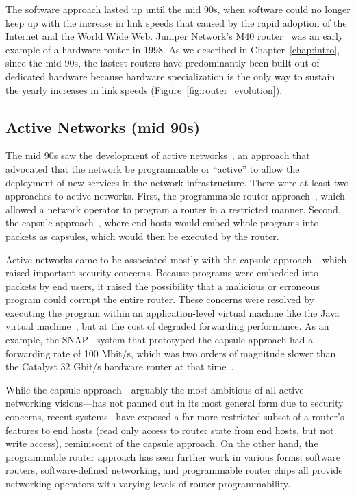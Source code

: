 The software approach lasted up until the mid 90s, when software could no
longer keep up with the increase in link speeds that caused by the rapid
adoption of the Internet and the World Wide Web. Juniper Network's M40
router~\cite{juniperm40} was an early example of a hardware router in 1998.  As
we described in Chapter~\ref{chap:intro}, since the mid 90s, the fastest
routers have predominantly been built out of dedicated hardware because
hardware specialization is the only way to sustain the yearly increases in link
speeds (Figure~\ref{fig:router_evolution}).

\subsection{Active Networks (mid 90s)}
The mid 90s saw the development of active networks~\cite{ants, switchware}, an
approach that advocated that the network be programmable or ``active'' to allow
the deployment of new services in the network infrastructure. There were at
least two approaches to active networks. First, the programmable router
approach~\cite{switchware}, which allowed a network operator to program a
router in a restricted manner. Second, the capsule approach~\cite{ants}, where
end hosts would embed whole programs into packets as capsules, which would then
be executed by the router.

Active networks came to be associated mostly with the capsule
approach~\cite{sdn_history}, which raised important security concerns. Because
programs were embedded into packets by end users, it raised the possibility
that a malicious or erroneous program could corrupt the entire router. These
concerns were resolved by executing the program within an application-level
virtual machine like the Java virtual machine~\cite{ants}, but at the cost of
degraded forwarding performance. As an example, the SNAP~\cite{snap} system
that prototyped the capsule approach had a forwarding rate of 100 Mbit/s, which
was two orders of magnitude slower than the Catalyst 32 Gbit/s hardware router
at that time~\cite{catalyst}.

While the capsule approach---arguably the most ambitious of all active
networking visions---has not panned out in its most general form due to
security concerns, recent systems~\cite{int} have exposed a far more restricted
subset of a router's features to end hosts (\eg read only access to router
state from end hosts, but not write access), reminiscent of the capsule
approach. On the other hand, the programmable router approach has seen further
work in various forms: software routers, software-defined networking, and
programmable router chips all provide networking operators with varying
levels of router programmability.

